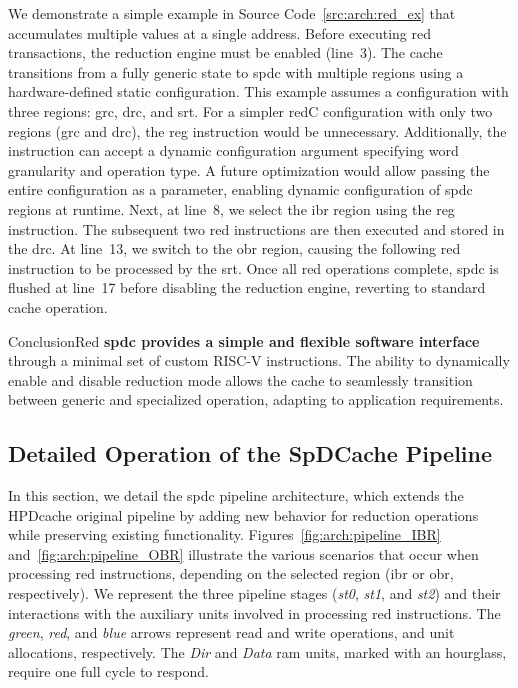 We demonstrate a simple example in Source Code~\ref{src:arch:red_ex} that accumulates multiple values at a single address.
Before executing \acrshort{red} transactions, the \gls{reduction} engine must be enabled (line~3).
The cache transitions from a fully generic state to \acrlong{spdc} with multiple regions using a hardware-defined static configuration.
This example assumes a configuration with three regions: \acrshort{grc}, \acrshort{drc}, and \acrshort{srt}.
For a simpler \gls{redC} configuration with only two regions (\acrshort{grc} and \acrshort{drc}), the \acrshort{reg} instruction would be unnecessary.
Additionally, the instruction can accept a dynamic configuration argument specifying word granularity and operation type.
A future optimization would allow passing the entire configuration as a parameter, enabling dynamic configuration of \acrlong{spdc} regions at runtime.
Next, at line~8, we select the \acrfull{ibr} region using the \acrshort{reg} instruction.
The subsequent two \acrshort{red} instructions are then executed and stored in the \acrshort{drc}.
At line~13, we switch to the \acrfull{obr} region, causing the following \acrshort{red} instruction to be processed by the \acrshort{srt}.
Once all \acrshort{red} operations complete, \acrlong{spdc} is flushed at line~17 before disabling the reduction engine, reverting to standard cache operation.


\begin{highlight}{Conclusion}{Red}
    \textbf{\acrlong{spdc} provides a simple and flexible software interface} through a minimal set of custom RISC-V instructions.
    The ability to dynamically enable and disable \gls{reduction} mode allows the cache to seamlessly transition between generic and specialized operation, adapting to application requirements.
\end{highlight}

\subsection{Detailed Operation of the SpDCache Pipeline}
\label{sec:arch:pipeline}

In this section, we detail the \acrlong{spdc} \gls{pipeline} architecture, which extends the HPDcache original \gls{pipeline} by adding new behavior for \gls{reduction} operations while preserving existing functionality.
Figures~\ref{fig:arch:pipeline_IBR} and~\ref{fig:arch:pipeline_OBR} illustrate the various scenarios that occur when processing \acrshort{red} instructions, depending on the selected region (\acrshort{ibr} or \acrshort{obr}, respectively).
We represent the three \gls{pipeline} stages (\textit{st0}, \textit{st1}, and \textit{st2}) and their interactions with the auxiliary units involved in processing \acrshort{red} instructions.
The \textit{green}, \textit{red}, and \textit{blue} arrows represent read and write operations, and unit allocations, respectively.
The \textit{Dir} and \textit{Data} \acrshort{ram} units, marked with an hourglass, require one full cycle to respond.

